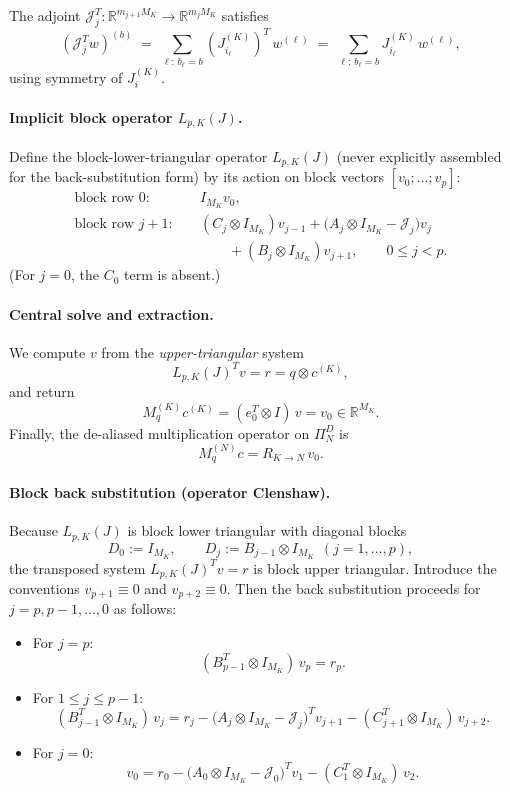 \documentclass[11pt]{article}
\begin{document}
The adjoint $\mathcal J_j^T:\mathbb{R}^{m_{j+1}M_K}\to\mathbb{R}^{m_jM_K}$ satisfies
\[
(\mathcal J_j^T w)^{(b)} \;=\;\sum_{\ell:\,b_\ell=b} (J_{i_\ell}^{(K)})^T\, w^{(\ell)}
\;=\;\sum_{\ell:\,b_\ell=b} J_{i_\ell}^{(K)}\, w^{(\ell)},
\]
using symmetry of $J_i^{(K)}$.

\paragraph{Implicit block operator $L_{p,K}(J)$.}
Define the block-lower-triangular operator $L_{p,K}(J)$ (never explicitly assembled for the back-substitution form)
by its action on block vectors $[v_0;\dots;v_p]$:
\begin{align*}
  \text{block row }0:\quad & I_{M_K}v_0,\\
  \text{block row }j+1:\quad &
    (C_j\otimes I_{M_K})v_{j-1}
    +\bigl(A_j\otimes I_{M_K}-\mathcal J_j\bigr)v_j\\
  &\qquad +(B_j\otimes I_{M_K})v_{j+1},\qquad 0\le j<p.
\end{align*}
(For $j=0$, the $C_0$ term is absent.)

\paragraph{Central solve and extraction.}
We compute $v$ from the \emph{upper-triangular} system
\[
L_{p,K}(J)^T v = r = q\otimes c^{(K)},
\]
and return
\[
M_q^{(K)} c^{(K)} = (e_0^T\otimes I)\, v = v_0 \in \mathbb{R}^{M_K}.
\]
Finally, the de-aliased multiplication operator on $\Pi_N^D$ is
\[
M_q^{(N)}c = R_{K\to N}\, v_0 .
\]

\paragraph{Block back substitution (operator Clenshaw).}
Because $L_{p,K}(J)$ is block lower triangular with diagonal blocks
\[
D_0 := I_{M_K},\qquad
D_j := B_{j-1}\otimes I_{M_K}\ \ (j=1,\dots,p),
\]
the transposed system $L_{p,K}(J)^T v=r$ is block upper triangular.
Introduce the conventions $v_{p+1}\equiv 0$ and $v_{p+2}\equiv 0$.
Then the back substitution proceeds for $j=p,p-1,\dots,0$ as follows:

\begin{itemize}
	\item For $j=p$:
	\[
	(B_{p-1}^T\otimes I_{M_K})\, v_p = r_p.
	\]
	\item For $1\le j\le p-1$:
	\[
	(B_{j-1}^T\otimes I_{M_K})\, v_j
	=
	r_j
	-
	\bigl(A_j\otimes I_{M_K} - \mathcal J_j\bigr)^T v_{j+1}
	-
	(C_{j+1}^T\otimes I_{M_K})\, v_{j+2}.
	\]
	\item For $j=0$:
	\[
	v_0
	=
	r_0
	-
	\bigl(A_0\otimes I_{M_K} - \mathcal J_0\bigr)^T v_1
	-
	(C_{1}^T\otimes I_{M_K})\, v_{2}.
	\]
\end{itemize}
\end{document}
